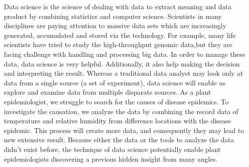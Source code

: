 \documentclass[12pt,a4paper]{article}
\begin{document}


Data science is the science of dealing with data to extract meaning and data product by combining statistics and computer science. Scientists in many disciplines are paying attention to massive data sets which are increasingly generated, accumulated and stored via the technology. For example, many life scientists have tried to study the   high-throughput genomic data,but they are facing challenge with handling and processing big data. In order to manage these data, data science is very helpful. Additionally, it also help making the decision and interpreting the result. Whereas a traditional data analyst may look only at data from a single source (a set of experiment), data science will enable us explore and examine data from multiple disparate sources. As a plant epidemiologist, we struggle to search for the causes of disease epidemics. To investigate the causation, we analyze the data by combining the record data of temperature and relative humidity from difference locations with the disease epidemic. This process will create more data, and consequently they may lead to new extensive result. Because either the data or the tools to analyze the data didn't exist before, the technique of data science potentially enable plant epidemiologists discovering a previous hidden insight from many angles.
\end{document}
